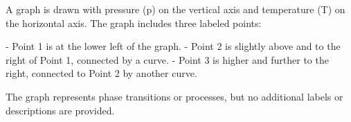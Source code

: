 A graph is drawn with pressure (p) on the vertical axis and temperature (T) on the horizontal axis. The graph includes three labeled points:  

- Point 1 is at the lower left of the graph.  
- Point 2 is slightly above and to the right of Point 1, connected by a curve.  
- Point 3 is higher and further to the right, connected to Point 2 by another curve.  

The graph represents phase transitions or processes, but no additional labels or descriptions are provided.